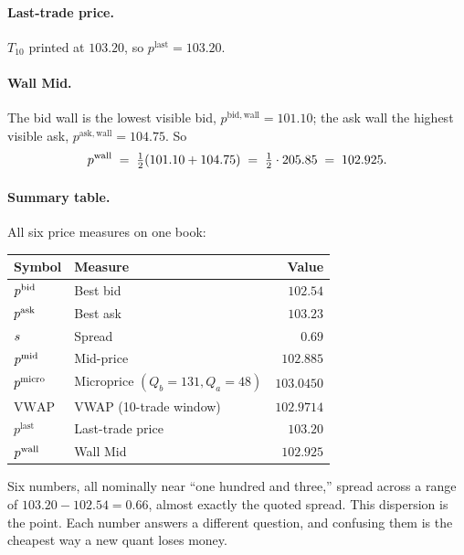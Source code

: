 \paragraph{Last-trade price.} $T_{10}$ printed at $103.20$, so
$p^{\mathrm{last}} = 103.20$.

\paragraph{Wall Mid.} The bid wall is the lowest visible bid,
$p^{\mathrm{bid,wall}} = 101.10$; the ask wall the highest visible
ask, $p^{\mathrm{ask,wall}} = 104.75$. So
\[
  p^{\mathrm{wall}} \;=\; \tfrac{1}{2}(101.10 + 104.75) \;=\; \tfrac{1}{2} \cdot 205.85 \;=\; 102.925.
\]

\paragraph{Summary table.} All six price measures on one book:

\begin{center}
\begin{tabular}{llr}
\toprule
Symbol & Measure & Value \\
\midrule
$p^{\mathrm{bid}}$                 & Best bid                          & $102.54$   \\
$p^{\mathrm{ask}}$                 & Best ask                          & $103.23$   \\
$s$              & Spread                            & $0.69$     \\
$p^{\mathrm{mid}}$                 & Mid-price                         & $102.885$  \\
$p^{\mathrm{micro}}$               & Microprice $(Q_b{=}131, Q_a{=}48)$ & $103.0450$ \\
$\mathrm{VWAP}$         & VWAP (10-trade window)            & $102.9714$ \\
$p^{\mathrm{last}}$     & Last-trade price                  & $103.20$   \\
$p^{\mathrm{wall}}$              & Wall Mid                          & $102.925$  \\
\bottomrule
\end{tabular}
\end{center}

Six numbers, all nominally near ``one hundred and three,'' spread
across a range of $103.20 - 102.54 = 0.66$, almost exactly the
quoted spread. This dispersion is the point. Each number answers a
different question, and confusing them is the cheapest way a new
quant loses money.

